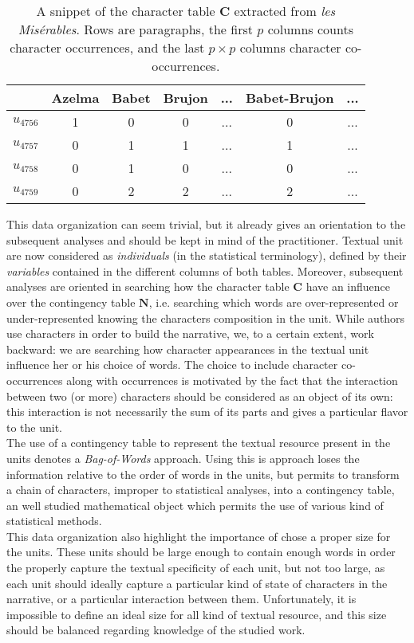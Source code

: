 \documentclass[
twocolumn,
]{ceurart}
\begin{document}
\begin{table}[h]
	\scriptsize
	\begin{tabular}{|c||c|c|c|c|c|c|}
		\hline
		  & Azelma & Babet & Brujon & ... & Babet-Brujon & ... \\
		 \hline
		 \hline 
		 $u_{4756}$ & 1 & 0 & 0 & ... & 0 & ... \\
		 \hline
		 $u_{4757}$ & 0 & 1 & 1 & ... & 1 & ... \\
		 \hline
		 $u_{4758}$ & 0 & 1 & 0 & ... & 0 & ... \\
		 \hline
		 $u_{4759}$ & 0 & 2 & 2 & ... & 2 & ... \\
		 \hline
	\end{tabular}
	\label{char_table}
	\caption{A snippet of the character table $\mathbf{C}$ extracted from \emph{les Misérables}. Rows are paragraphs, the first $p$ columns counts character occurrences, and the last $p \times p$ columns character co-occurrences.}
\end{table}

This data organization can seem trivial, but it already gives an orientation to the subsequent analyses and should be kept in mind of the practitioner. Textual unit are now considered as \emph{individuals} (in the statistical terminology), defined by their \emph{variables} contained in the different columns of both tables. Moreover, subsequent analyses are oriented in searching how the character table $\mathbf{C}$ have an influence over the contingency table $\mathbf{N}$, i.e. searching which words are over-represented or under-represented knowing the characters composition in the unit. While authors use characters in order to build the narrative, we, to a certain extent, work backward: we are searching how character appearances in the textual unit influence her or his choice of words. The choice to include character co-occurrences along with occurrences is motivated by the fact that the interaction between two (or more) characters should be considered as an object of its own: this interaction is not necessarily the sum of its parts and gives a particular flavor to the unit. \\
The use of a contingency table to represent the textual resource present in the units denotes a \emph{Bag-of-Words} approach. Using this is approach loses the information relative to the order of words in the units, but permits to transform a chain of characters, improper to statistical analyses, into a contingency table, an well studied mathematical object which permits the use of various kind of statistical methods. \\
This data organization also highlight the importance of chose a proper size for the units. These units should be large enough to contain enough words in order the properly capture the textual specificity of each unit, but not too large, as each unit should ideally capture a particular kind of state of characters in the narrative, or a particular interaction between them. Unfortunately, it is impossible to define an ideal size for all kind of textual resource, and this size should be balanced regarding knowledge of the studied work.  
\end{document}
